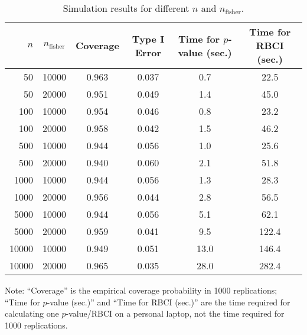 \documentclass[
]{article}
\author{}
\date{\vspace{-2.5em}}
\begin{document}
\begin{table}[p]

\caption{\label{tab:sim}Simulation results for different $n$ and $n_{\text{fisher}}$.}
\centering
\begin{threeparttable}
\begin{tabular}[t]{rccccc}
\toprule
$n$ & $n_{\text{fisher}}$ & Coverage & Type I Error & Time for $p$-value (sec.) & Time for RBCI (sec.)\\
\midrule
50 & 10000 & 0.963 & 0.037 & 0.7 & 22.5\\
50 & 20000 & 0.951 & 0.049 & 1.4 & 45.0\\
\midrule
100 & 10000 & 0.954 & 0.046 & 0.8 & 23.2\\
100 & 20000 & 0.958 & 0.042 & 1.5 & 46.2\\
\midrule
500 & 10000 & 0.944 & 0.056 & 1.0 & 25.6\\
500 & 20000 & 0.940 & 0.060 & 2.1 & 51.8\\
\midrule
1000 & 10000 & 0.944 & 0.056 & 1.3 & 28.3\\
1000 & 20000 & 0.956 & 0.044 & 2.8 & 56.5\\
\midrule
5000 & 10000 & 0.944 & 0.056 & 5.1 & 62.1\\
5000 & 20000 & 0.959 & 0.041 & 9.5 & 122.4\\
\midrule
10000 & 10000 & 0.949 & 0.051 & 13.0 & 146.4\\
10000 & 20000 & 0.965 & 0.035 & 28.0 & 282.4\\
\bottomrule
\end{tabular}
\begin{tablenotes}
\item Note: ``Coverage'' is the empirical coverage probability in 1000 replications; ``Time for $p$-value (sec.)'' and ``Time for RBCI (sec.)'' are the time required for calculating one $p$-value/RBCI on a personal laptop, not the time required for 1000 replications.
\end{tablenotes}
\end{threeparttable}
\end{table}
\end{document}
